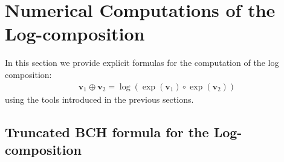 \section{Numerical Computations of the Log-composition}

In this section we provide explicit formulas for the computation of the log composition:
\begin{align}\label{eq:general_numerical_log_composition}
\mathbf{v}_{1}\oplus \mathbf{v}_{2} =  \log(\exp(\mathbf{v}_1)\circ \exp(\mathbf{v}_2))
\end{align}
using the tools introduced in the previous sections.

\subsection{Truncated BCH formula for the Log-composition}\label{se:bch_formula}

